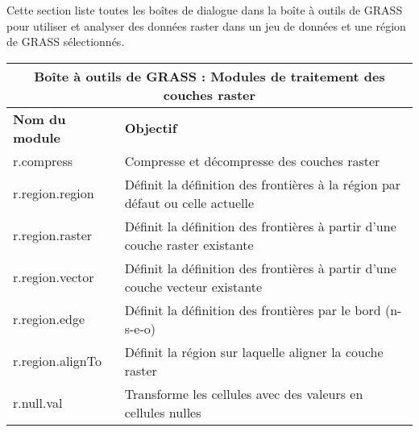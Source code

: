 Cette section liste toutes les boîtes de dialogue dans la boîte à outils de GRASS pour utiliser et analyser des données raster dans un jeu de données et une région de GRASS sélectionnés.
\begin{table}[H]
\centering
 \begin{tabular}{|p{4cm}|p{10cm}|}
  \hline \multicolumn{2}{|c|}{\textbf{Boîte à outils de GRASS : Modules de traitement des couches raster}} \\
  \hline \textbf{Nom du module} & \textbf{Objectif} \\
  \hline r.compress & Compresse et décompresse des couches raster \\
  \hline r.region.region & Définit la définition des frontières à la région par défaut ou celle actuelle \\
  \hline r.region.raster & Définit la définition des frontières à partir d'une couche raster existante \\
  \hline r.region.vector & Définit la définition des frontières à partir d'une couche vecteur existante \\
  \hline r.region.edge & Définit la définition des frontières par le bord (n-s-e-o) \\
  \hline r.region.alignTo & Définit la région sur laquelle aligner la couche raster \\
  \hline r.null.val & Transforme les cellules avec des valeurs en cellules nulles\\

\end{tabular}
\end{table}
